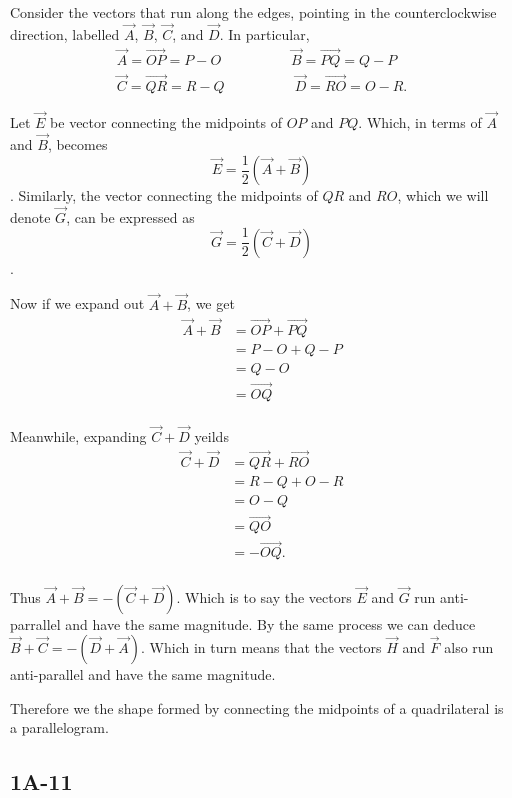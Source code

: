Consider the vectors that run along the edges, pointing in the counterclockwise
direction, labelled $\vec{A}$, $\vec{B}$, $\vec{C}$, and $\vec{D}$. 
In particular, 
\begin{align*}
\vec{A} = \vec{OP} = P - O\hspace{5em}
\vec{B} = \vec{PQ} = Q - P\\ 
\vec{C} = \vec{QR} = R - Q\hspace{5em}
\vec{D} = \vec{RO} = O - R.
\end{align*}

Let $\vec{E}$ be vector connecting the midpoints of $OP$ and $PQ$.
Which, in terms of $\vec{A}$ and $\vec{B}$, becomes 
\[\vec{E} = \frac{1}{2}(\vec{A} + \vec{B})\].
Similarly, the vector connecting the midpoints of $QR$ and $RO$, which
we will denote $\vec{G}$, can be expressed as 
\[\vec{G} = \frac{1}{2}(\vec{C} + \vec{D})\].

Now if we expand out $\vec{A} + \vec{B}$, we get
\begin{align*} 
\vec{A} + \vec{B} &= \vec{OP} + \vec{PQ}\\
                  &= P - O + Q - P\\
                  &=  Q - O \\
                  &=  \vec{OQ} \\
\end{align*}

Meanwhile, expanding $\vec{C} + \vec{D}$ yeilds
\begin{align*} 
\vec{C} + \vec{D} &= \vec{QR} + \vec{RO}\\ 
                  &= R - Q + O - R\\ 
                  &=  O - Q \\
                  &=  \vec{QO} \\
                  &=  -\vec{OQ}. \\
\end{align*}

Thus $\vec{A} + \vec{B} = -(\vec{C} + \vec{D})$.
Which is to say the vectors $\vec{E}$ and $\vec{G}$ run anti-parrallel 
and have the same magnitude. By the same process we can deduce 
$\vec{B}+\vec{C} = -(\vec{D}+\vec{A})$. 
Which in turn means that the vectors $\vec{H}$ and $\vec{F}$ also run 
anti-parallel  and have the same magnitude.

Therefore we the shape formed by connecting the midpoints of a 
quadrilateral is a parallelogram.



\subsection*{1A-11}

